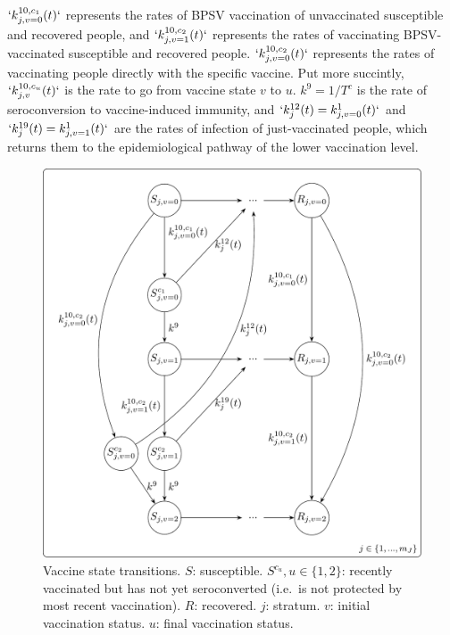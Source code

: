 \documentclass[
]{article}
\makeatletter
\newcounter{figno}
\newenvironment{fignos:no-prefix-figure-caption}{
  \caption@ifcompatibility{}{
    \let\oldthefigure\thefigure
    \let\oldtheHfigure\theHfigure
    \renewcommand{\thefigure}{figno:\thefigno}
    \renewcommand{\theHfigure}{figno:\thefigno}
    \stepcounter{figno}
    \captionsetup{labelformat=empty}
  }
}{
  \caption@ifcompatibility{}{
    \captionsetup{labelformat=default}
    \let\thefigure\oldthefigure
    \let\theHfigure\oldtheHfigure
    \addtocounter{figure}{-1}
  }
}
\makeatother
\begin{document}
\(`k^{10,c_1}_{j,v=0}(t)`\) represents the rates of BPSV vaccination of unvaccinated susceptible and recovered people, and \(`k^{10,c_2}_{j,v=1}(t)`\) represents the rates of vaccinating BPSV-vaccinated susceptible and recovered people. \(`k^{10,c_2}_{j,v=0}(t)`\) represents the rates of vaccinating people directly with the specific vaccine. Put more succintly, \(`k^{10,c_u}_{j,v}(t)`\) is the rate to go from vaccine state \(v\) to \(u\). \(k^9=1/T^c\) is the rate of seroconversion to vaccine-induced immunity, and \(`k^{12}_{j}(t)=k^{1}_{j,v=0}(t)`\) and \(`k^{19}_{j}(t)=k^{1}_{j,v=1}(t)`\) are the rates of infection of just-vaccinated people, which returns them to the epidemiological pathway of the lower vaccination level.

\begin{fignos:no-prefix-figure-caption}

\begin{figure}
\centering
\includegraphics{README_files/figure-latex/vaccinetransitions-1.png}
\caption{\label{fig:vaccinetransitions}Vaccine state transitions. \(S\): susceptible. \(S^{c_u}, u\in\{1,2\}\): recently vaccinated but has not yet seroconverted (i.e.~is not protected by most recent vaccination). \(R\): recovered. \(j\): stratum. \(v\): initial vaccination status. \(u\): final vaccination status.}
\end{figure}

\end{fignos:no-prefix-figure-caption}
\end{document}
